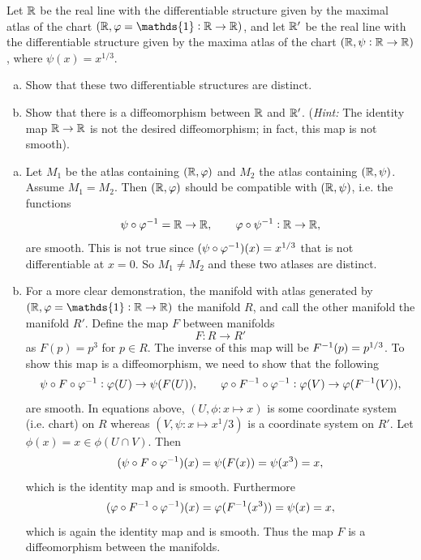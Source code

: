 \begin{problem}
	Let $ \mathbb{R} $ be the real line with the differentiable structure given by the maximal atlas of the chart $ (\R, \phi=\mathds{1}:\R \to \R) $, and let $ \mathbb{R}' $ be the real line with the differentiable structure given by the maxima atlas of the chart $ (\mathbb{R}, \psi:\mathbb{R}\to\mathbb{R}) $, where $ \psi(x) = x^{1/3} $.
	\begin{enumerate}[(a)]
		\item Show that these two differentiable structures are distinct.
		\item Show that there is a diffeomorphism between $ \mathbb{R} $ and $ \mathbb{R}' $. (\emph{Hint:} The identity map $ \mathbb{R} \to \mathbb{R}  $ is not  the desired diffeomorphism; in fact, this map is not smooth).
	\end{enumerate}
\end{problem}
\begin{solution}
	\begin{enumerate}[(a)]
		\item Let $ M_1 $ be the atlas containing $ (\mathbb{R},\varphi) $ and $ M_2 $ the atlas containing $ (\mathbb{R},\psi) $. Assume $ M_1 = M_2 $. Then $ (\mathbb{R},\varphi) $ should be compatible with $ (\mathbb{R},\psi) $, i.e. the functions
		\[ \psi \circ \varphi^{-1} = \mathbb{R} \to \mathbb{R}, \qquad \varphi\circ \psi^{-1}:\mathbb{R} \to \mathbb{R}, \]
		are smooth. This is not true since $ (\psi \circ \varphi^{-1} )(x) = x^{1/3} $ that is not differentiable at $ x=0 $. So $ M_1 \neq M_2 $ and these two atlases are distinct.
		\item For a more clear demonstration, the manifold with atlas generated by $ (\R,\phi=\mathds{1}:\R\to \R) $ the manifold $ R $, and call the other manifold the manifold $ R' $. Define the map $ F $ between manifolds
		\[ F: R \to R' \]
		as $ F(p) = p^3 $ for $ p \in R $. The inverse of this map will be $ F^{-1}(p) = p^{1/3} $. To show this map is a diffeomorphism, we need to show that the following 
		\[ \psi \circ F \circ \varphi^{-1}: \varphi(U)\to \psi(F(U)), \qquad \varphi\circ F^{-1}\circ\varphi^{-1}: \varphi(V) \to \varphi(F^{-1}(V)), \]
		are smooth. In  equations above, $ (U,\phi: x\mapsto x) $ is some coordinate system (i.e. chart) on $ R $ whereas $ (V,\psi: x\mapsto x^1/3) $ is a coordinate system on $ R' $. Let $ \phi(x) = x \in \phi(U\cap V) $. Then
		\[ (\psi\circ F \circ\varphi^{-1})(x) = \psi(F(x)) = \psi(x^3) = x,\]
		which is the identity map and is smooth. Furthermore
		\[( \varphi\circ F^{-1}\circ\varphi^{-1})(x) = \varphi(F^{-1}(x^3)) = \psi(x) = x,\]
		which is again the identity map and is smooth. Thus the map $ F $ is a diffeomorphism between the manifolds.
	\end{enumerate}
\end{solution}


